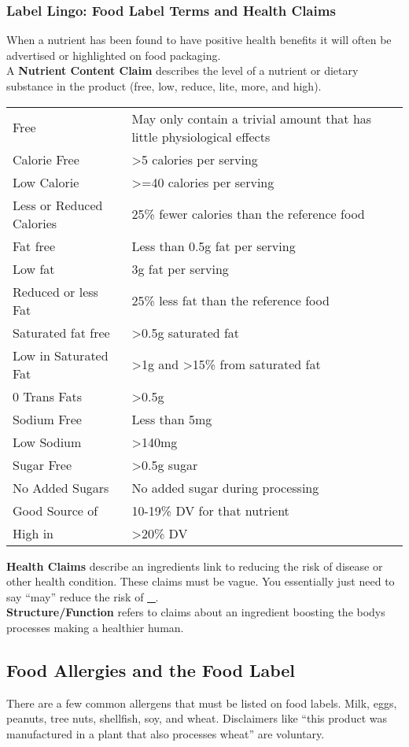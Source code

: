 \documentclass[letterpaper, 11pt]{article}
\begin{document}
\subsubsection{Label Lingo: Food Label Terms and Health Claims}
\label{sec:org166b923}
When a nutrient has been found to have positive health benefits it will often be advertised or highlighted on food packaging.\\
A \textbf{Nutrient Content Claim} describes the level of a nutrient or dietary substance in the product (free, low, reduce, lite, more, and high).\\
\begin{center}
\begin{tabular}{ll}
Free & May only contain a trivial amount that has little physiological effects\\
Calorie Free & >5 calories per serving\\
Low Calorie & >=40 calories per serving\\
Less or Reduced Calories & 25\% fewer calories than the reference food\\
Fat free & Less than 0.5g fat per serving\\
Low fat & 3g fat per serving\\
Reduced or less Fat & 25\% less fat than the reference food\\
Saturated fat free & >0.5g saturated fat\\
Low in Saturated Fat & >1g and >15\% from saturated fat\\
0 Trans Fats & >0.5g\\
Sodium Free & Less than 5mg\\
Low Sodium & >140mg\\
Sugar Free & >0.5g sugar\\
No Added Sugars & No added sugar during processing\\
Good Source of & 10-19\% DV for that nutrient\\
High in & >20\% DV\\
\end{tabular}
\end{center}
\textbf{Health Claims} describe an ingredients link to reducing the risk of disease or other health condition. These claims must be vague. You essentially just need to say ``may'' reduce the risk of \uline{\uline{\_}}.\\
\textbf{Structure/Function} refers to claims about an ingredient boosting the bodys processes making a healthier human.\\
\subsection{Food Allergies and the Food Label}
\label{sec:orgccd6869}
There are a few common allergens that must be listed on food labels. Milk, eggs, peanuts, tree nuts, shellfish, soy, and wheat. Disclaimers like ``this product was manufactured in a plant that also processes wheat'' are voluntary.\\
\end{document}
